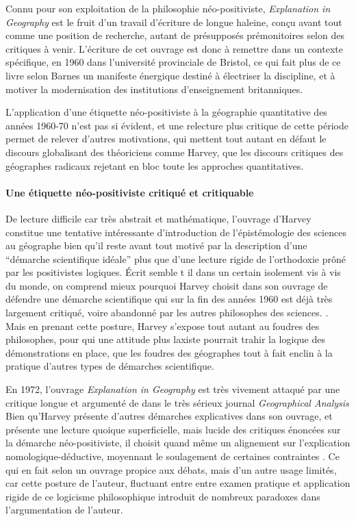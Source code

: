 Connu pour son exploitation de la philosophie néo-positiviste, \textit{Explanation in Geography} est le fruit d'un travail d'écriture de longue haleine, conçu avant tout comme une position de recherche, autant de présupposés prémonitoires selon \textcite[47]{Barnes2006} des critiques à venir. L'écriture de cet ouvrage est donc à remettre dans un contexte spécifique, en 1960 dans l'université provinciale de Bristol, ce qui fait plus de ce livre selon Barnes \autocite[31-36]{Barnes2006} un manifeste énergique destiné à électriser la discipline, et à motiver la modernisation des institutions d'enseignement britanniques.

L'application d'une étiquette néo-positiviste à la géographie quantitative des années 1960-70 n'est pas si évident, et une relecture plus critique de cette période permet de relever d'autres motivations, qui mettent tout autant en défaut le discours globalisant des théoriciens comme Harvey, que les discours critiques des géographes radicaux rejetant en bloc toute les approches quantitatives.

\paragraph{Une étiquette néo-positiviste critiqué et critiquable}

De lecture difficile car très abstrait et mathématique, l'ouvrage d'Harvey constitue une tentative intéressante d'introduction de l'épistémologie des sciences au géographe bien qu'il reste avant tout motivé par la description d'une \enquote{démarche scientifique idéale} plus que d'une lecture rigide de l'orthodoxie prôné par les positivistes logiques. Écrit semble t il dans un certain isolement vis à vis du monde, on comprend mieux pourquoi Harvey choisit dans son ouvrage de défendre une démarche scientifique qui sur la fin des années 1960 est déjà très largement critiqué, voire abandonné par les autres philosophes des sciences. \autocite[57]{Harvey1969} \autocite[147]{Ouelbani2006}. Mais en prenant cette posture, Harvey s'expose tout autant au foudres des philosophes, pour qui une attitude plus laxiste pourrait trahir la logique des démonstrations en place, que les foudres des géographes tout à fait enclin à la pratique d'autres types de démarches scientifique.

En 1972, l'ouvrage \textit{Explanation in Geography} est très vivement attaqué par une critique longue et argumenté de \textcite{Gale1972} dans le très sérieux journal \textit{Geographical Analysis} Bien qu'Harvey présente d'autres démarches explicatives dans son ouvrage, et présente une lecture quoique superficielle, mais lucide des critiques énoncées sur la démarche néo-positiviste, il choisit quand même un alignement sur l'explication nomologique-déductive, moyennant le soulagement de certaines contraintes \autocite[39-40]{Paterson1984}. Ce qui en fait selon \textcite{Gale1972} un ouvrage propice aux débats, mais d'un autre usage limités, car cette posture de l'auteur, fluctuant entre entre examen pratique et application rigide de ce logicisme philosophique introduit de nombreux paradoxes dans l'argumentation de l'auteur.

